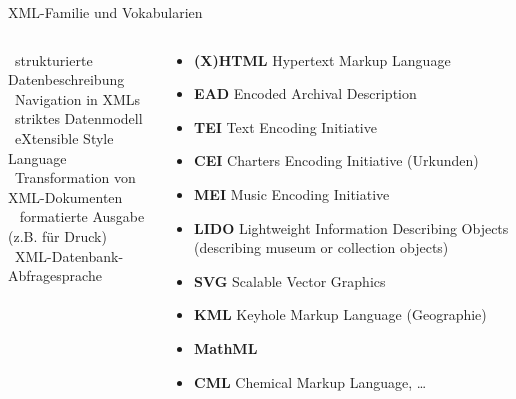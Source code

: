 \begin{frame}{XML-Familie und Vokabularien}
\begin{columns}
\footnotesize
{}~strukturierte Datenbeschreibung \\
~Navigation in XMLs \\
~striktes Datenmodell \\
~eXtensible Style Language \\
~Transformation von XML-Dokumenten  \\
~ formatierte Ausgabe (z.B. für Druck) \\
~XML-Datenbank-Abfragesprache \\
~
\begin{block}{}
\footnotesize
\begin{itemize}
    \item \textbf{(X)HTML} Hypertext Markup Language 
    \item \textbf{EAD} Encoded Archival Description 
    \item \textbf{TEI} Text Encoding Initiative 
    \item \textbf{CEI} Charters Encoding Initiative (Urkunden)
    \item \textbf{MEI} Music Encoding Initiative 
    \item \textbf{LIDO} Lightweight Information Describing Objects (describing museum or collection objects)
    \item \textbf{SVG} Scalable Vector Graphics 
    \item \textbf{KML} Keyhole Markup Language (Geographie)
    \item \textbf{MathML} 
    \item \textbf{CML} Chemical Markup Language, \dots
\end{itemize}
\end{block}
\end{columns}


\end{frame}



